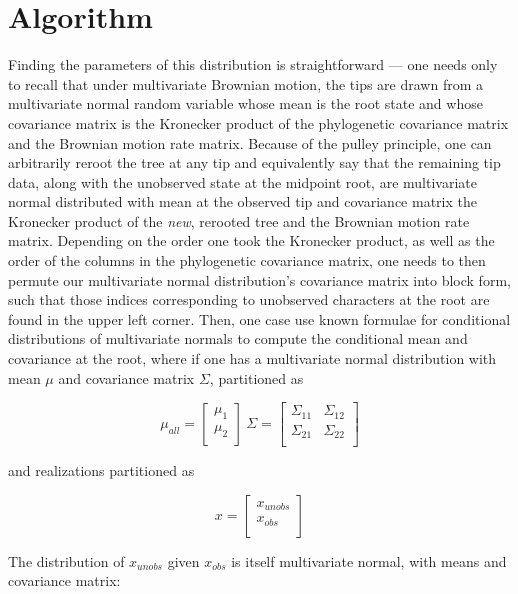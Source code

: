 \clearpage

\section{Algorithm}

Finding the parameters of this distribution is straightforward --- one needs only to recall that under multivariate Brownian motion, the tips are drawn from a multivariate normal random variable whose mean is the root state and whose covariance matrix is the Kronecker product of the phylogenetic covariance matrix and the Brownian motion rate matrix. Because of the pulley principle, one can arbitrarily reroot the tree at any tip and equivalently say that the remaining tip data, along with the unobserved state at the midpoint root, are multivariate normal distributed with mean at the observed tip and covariance matrix the Kronecker product of the \textit{new}, rerooted tree and the Brownian motion rate matrix. Depending on the order one took the Kronecker product, as well as the order of the columns in the phylogenetic covariance matrix, one needs to then permute our multivariate normal distribution's covariance matrix into block form, such that those indices corresponding to unobserved characters at the root are found in the upper left corner. Then, one case use known formulae for conditional distributions of multivariate normals to compute the conditional mean and covariance at the root, where if one has a multivariate normal distribution with mean $\mu$ and covariance matrix $\Sigma$, partitioned as

{\large\[\mu_{all} = \begin{bmatrix}
\mu_{1} \\
\mu_{2} \\
\end{bmatrix} \
\Sigma = \begin{bmatrix}
\Sigma_{11} & \Sigma_{12}\\
\Sigma_{21} & \Sigma_{22}\\
\end{bmatrix}
\]}

and realizations partitioned as

{\large\[x = \begin{bmatrix}
x_{unobs} \\
x_{obs} \\
\end{bmatrix}\]}

The distribution of $x_{unobs}$ given $x_{obs}$ is itself multivariate normal, with means and covariance matrix:

